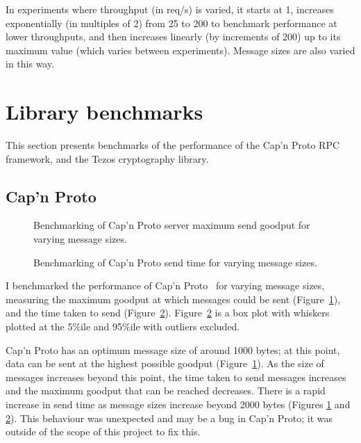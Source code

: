 In experiments where throughput (in req/s) is varied, it starts at 1, increases exponentially (in multiples of 2) from 25 to 200 to benchmark performance at lower throughputs, and then increases linearly (by increments of 200) up to its maximum value (which varies between experiments). Message sizes are also varied in this way.

\section{Library benchmarks} \label{librarybenchmarks}
This section presents benchmarks of the performance of the Cap'n Proto RPC framework, and the Tezos cryptography library.

\subsection{Cap'n Proto} \label{capnpbenchmark}

\begin{figure}[h!]
\centering
\resizebox{.6\textwidth}{!}{}
\caption{Benchmarking of Cap'n Proto server maximum send goodput for varying message sizes.}
\label{sizegoodput}
\end{figure}

\begin{figure}[h!]
\centering
\resizebox{.6\textwidth}{!}{}
\caption{Benchmarking of Cap'n Proto send time for varying message sizes.}
\label{sizesendtime}
\end{figure}

I benchmarked the performance of Cap'n Proto~\cite{capnp} for varying message sizes, measuring the maximum goodput at which messages could be sent (Figure~\ref{sizegoodput}), and the time taken to send (Figure~\ref{sizesendtime}). Figure~\ref{sizesendtime} is a box plot with whiskers plotted at the 5\%ile and 95\%ile with outliers excluded.

Cap'n Proto has an optimum message size of around 1000 bytes; at this point, data can be sent at the highest possible goodput (Figure~\ref{sizegoodput}). As the size of messages increases beyond this point, the time taken to send messages increases and the maximum goodput that can be reached decreases. There is a rapid increase in send time as message sizes increase beyond 2000 bytes (Figures \ref{sizegoodput} and \ref{sizesendtime}). This behaviour was unexpected and may be a bug in Cap'n Proto; it was outside of the scope of this project to fix this.

